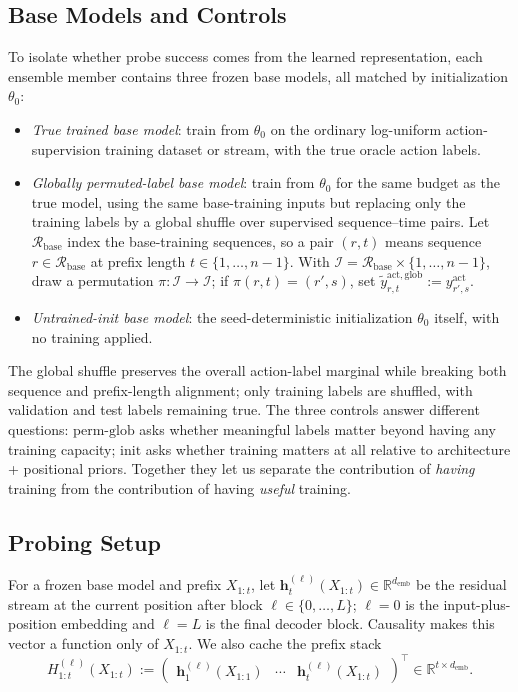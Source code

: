 \documentclass[11pt]{article}
\begin{document}
\subsection{Base Models and Controls}
\label{sec:probe-control-base-models}

To isolate whether probe success comes from the learned representation, each ensemble member contains three frozen base models, all matched by initialization $\theta_0$:
\begin{itemize}
\item \emph{True trained base model}: train from $\theta_0$ on the ordinary log-uniform action-supervision training dataset or stream, with the true oracle action labels.
\item \emph{Globally permuted-label base model}: train from $\theta_0$ for the same budget as the true model, using the same base-training inputs but replacing only the training labels by a global shuffle over supervised sequence--time pairs. Let $\mathcal{R}_{\mathrm{base}}$ index the base-training sequences, so a pair $(r,t)$ means sequence $r\in\mathcal{R}_{\mathrm{base}}$ at prefix length $t\in\{1,\ldots,n-1\}$. With $\mathcal{I}=\mathcal{R}_{\mathrm{base}}\times\{1,\ldots,n-1\}$, draw a permutation $\pi:\mathcal{I}\to\mathcal{I}$; if $\pi(r,t)=(r',s)$, set $\tilde y^{\mathrm{act,glob}}_{r,t}:=y^{\mathrm{act}}_{r',s}$.
\item \emph{Untrained-init base model}: the seed-deterministic initialization $\theta_0$ itself, with no training applied. 
\end{itemize}
The global shuffle preserves the overall action-label marginal while breaking both sequence and prefix-length alignment; only training labels are shuffled, with validation and test labels remaining true. The three controls answer different questions: $\mathrm{perm\text{-}glob}$ asks whether meaningful labels matter beyond having any training capacity; $\mathrm{init}$ asks whether training matters at all relative to architecture + positional priors. Together they let us separate the contribution of \emph{having} training from the contribution of having \emph{useful} training.

\subsection{Probing Setup}
\label{sec:probe-setup}

For a frozen base model and prefix $X_{1:t}$, let $\mathbf{h}_t^{(\ell)}(X_{1:t}) \in \mathbb{R}^{d_{\mathrm{emb}}}$ be the residual stream at the current position after block $\ell \in \{0,\ldots,L\}$; $\ell=0$ is the input-plus-position embedding and $\ell=L$ is the final decoder block. Causality makes this vector a function only of $X_{1:t}$. We also cache the prefix stack
\[
H_{1:t}^{(\ell)}(X_{1:t})
:=
\begin{pmatrix}
\mathbf{h}_1^{(\ell)}(X_{1:1}) &
\cdots &
\mathbf{h}_t^{(\ell)}(X_{1:t})
\end{pmatrix}^{\!\top}
\in \mathbb{R}^{t\times d_{\mathrm{emb}}}.
\]
\end{document}
